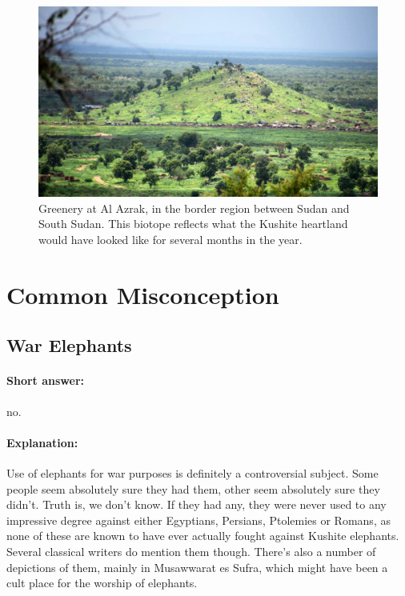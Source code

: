 \documentclass[a4paper,12pt]{scrreprt}
\begin{document}
\begin{figure}[H]
	\centering
	\includegraphics[width=\textwidth]{img/greenery_al_azrak}
	\caption{Greenery at Al Azrak, in the border region between Sudan and South Sudan. This biotope reflects what the Kushite heartland would have looked like for several months in the year.}
\end{figure}

\section{Common Misconception}

\subsection{War Elephants}

\paragraph{Short answer:} no.

\paragraph{Explanation:}

Use of elephants for war purposes is definitely a controversial subject. Some people seem absolutely sure they had them, other seem absolutely sure they didn't. Truth is, we don't know. If they had any, they were never used to any impressive degree against either Egyptians, Persians, Ptolemies or Romans, as none of these are known to have ever actually fought against Kushite elephants. Several classical writers do mention them though. There's also a number of depictions of them, mainly in Musawwarat es Sufra, which might have been a cult place for the worship of elephants.\\
\end{document}
